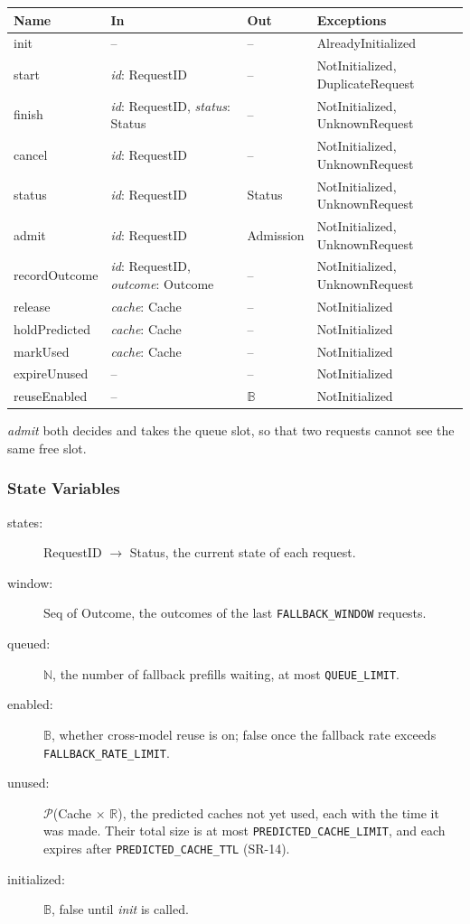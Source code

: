 \documentclass[12pt, titlepage]{article}
\begin{document}
\begin{tabularx}{\textwidth}{l X l X}
\toprule
\textbf{Name} & \textbf{In} & \textbf{Out} & \textbf{Exceptions}\\
\midrule
init & -- & -- & AlreadyInitialized\\
start & \emph{id}: RequestID & -- & NotInitialized, DuplicateRequest\\
finish & \emph{id}: RequestID, \emph{status}: Status & -- & NotInitialized, UnknownRequest\\
cancel & \emph{id}: RequestID & -- & NotInitialized, UnknownRequest\\
status & \emph{id}: RequestID & Status & NotInitialized, UnknownRequest\\
admit & \emph{id}: RequestID & Admission & NotInitialized, UnknownRequest\\
recordOutcome & \emph{id}: RequestID, \emph{outcome}: Outcome & -- & NotInitialized, UnknownRequest\\
release & \emph{cache}: Cache & -- & NotInitialized\\
holdPredicted & \emph{cache}: Cache & -- & NotInitialized\\
markUsed & \emph{cache}: Cache & -- & NotInitialized\\
expireUnused & -- & -- & NotInitialized\\
reuseEnabled & -- & $\mathbb{B}$ & NotInitialized\\
\bottomrule
\end{tabularx}

\emph{admit} both decides and takes the queue slot, so that two requests cannot
see the same free slot.

\subsubsection*{State Variables}

\begin{description}
\item[states:] RequestID $\to$ Status, the current state of each request.
\item[window:] Seq of Outcome, the outcomes of the last \texttt{FALLBACK\_WINDOW} requests.
\item[queued:] $\mathbb{N}$, the number of fallback prefills waiting, at most \texttt{QUEUE\_LIMIT}.
\item[enabled:] $\mathbb{B}$, whether cross-model reuse is on; false once the fallback rate exceeds \texttt{FALLBACK\_RATE\_LIMIT}.
\item[unused:] $\mathcal{P}$(Cache $\times$ $\mathbb{R}$), the predicted caches not yet used, each with the time it was made. Their total size is at most \texttt{PREDICTED\_CACHE\_LIMIT}, and each expires after \texttt{PREDICTED\_CACHE\_TTL} (SR-14).
\item[initialized:] $\mathbb{B}$, false until \emph{init} is called.
\end{description}
\end{document}
